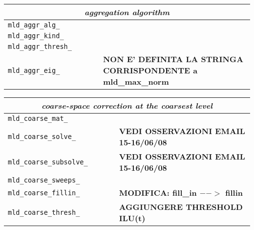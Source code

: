 \begin{sidewaystable}
\begin{center}
\begin{tabular}{|l|l|p{1.5cm}|l|p{6cm}|}
\multicolumn{5}{|c|}{\emph{aggregation algorithm}}                                                   \\ \hline
\verb|mld_aggr_alg_|     &
                         &
                         &
                         &                                                                           \\
\verb|mld_aggr_kind_|    &
                         &
                         &
                         &     \\
\verb|mld_aggr_thresh_|  &
                         &
                         &
                         &     \\
\verb|mld_aggr_eig_|     &
                         &
                         &
                         & \textbf{NON E' DEFINITA LA STRINGA CORRISPONDENTE a mld\_max\_norm}           \\ \hline
                       \end{tabular}
                     \end{center}
                   \end{sidewaystable}                     
\begin{sidewaystable}
\begin{center}
\begin{tabular}{|l|l|p{1.5cm}|l|p{6cm}|}
\multicolumn{5}{|c|}{\emph{coarse-space correction at the coarsest level}}                               \\ \hline
\verb|mld_coarse_mat_|   &
                         &
                         &
                         &     \\
\verb|mld_coarse_solve_| &
                         &
                         &
                         & \textbf{VEDI OSSERVAZIONI EMAIL 15-16/06/08}\\
\verb|mld_coarse_subsolve_| &
                         &
                         &
                         & \textbf{VEDI OSSERVAZIONI EMAIL 15-16/06/08}\\
\verb|mld_coarse_sweeps_|&                         
                         &
                         &
                         &     \\
\verb|mld_coarse_fillin_| &
                         &
                         &
                         &     \textbf{MODIFICA: fill\_in $-->$ fillin} \\
\verb|mld_coarse_thresh_| &
                         &
                         &
                         &    \textbf{AGGIUNGERE THRESHOLD ILU(t)} \\ \hline
\end{tabular}
\end{center}
\end{sidewaystable}


